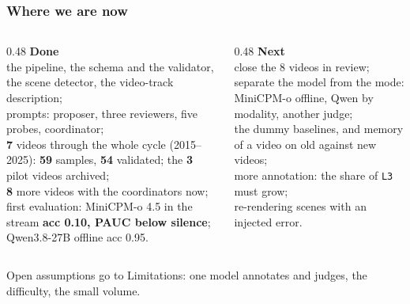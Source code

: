 \documentclass[aspectratio=169,10pt]{beamer}
\newcommand{\lead}[1]{{\color{warm}\textbf{#1}}}
\newcommand{\num}[1]{{\color{accent}\textbf{#1}}}
\begin{document}
\begin{frame}
  \frametitle{Where we are now}

  \begin{columns}[T]
    \begin{column}{0.48\textwidth}
      \textbf{Done}\\[0.3em]
      {\small
      the pipeline, the schema and the validator, the scene detector, the video-track description;\\[0.2em]
      prompts: proposer, three reviewers, five probes, coordinator;\\[0.2em]
      \num{7} videos through the whole cycle (2015--2025): \num{59} samples, \num{54} validated;
      the \num{3} pilot videos archived;\\[0.2em]
      \num{8} more videos with the coordinators now;\\[0.2em]
      first evaluation: MiniCPM-o 4.5 in the stream \lead{acc 0.10, PAUC below silence};
      Qwen3.8-27B offline acc 0.95.}
    \end{column}
    \begin{column}{0.48\textwidth}
      \textbf{Next}\\[0.3em]
      {\small
      close the 8 videos in review;\\[0.2em]
      separate the model from the mode: MiniCPM-o offline, Qwen by modality, another judge;\\[0.2em]
      the dummy baselines, and memory of a video on old against new videos;\\[0.2em]
      more annotation: the share of \texttt{L3} must grow;\\[0.2em]
      re-rendering scenes with an injected error.}
    \end{column}
  \end{columns}

  \vspace{0.6em}
  \begin{center}
    {\color{muted}\footnotesize Open assumptions go to Limitations: one model annotates and judges,
    the difficulty, the small volume.}
  \end{center}
\end{frame}
\end{document}

